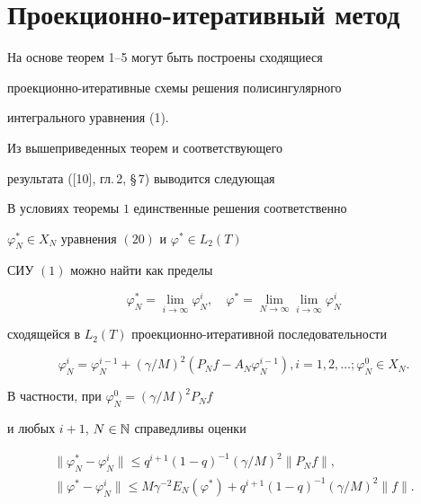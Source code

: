 \section{Проекционно-итеративный метод}





На основе теорем 1--5 могут быть построены сходящиеся


проекционно-итеративные схемы решения полисингулярного 


интегрального уравнения (1).





Из вышеприведенных теорем и соответствующего 


результата ([10], гл.\,2, \S\,7) выводится следующая








\begin{thm}


В условиях теоремы $1$ единственные решения соответственно


$\varphi_N^* \in X_N $ уравнения $(20)$ и $\varphi^\ast\in L_2(T)$


СИУ $(1)$ можно найти как пределы


$$


\varphi_N^*=\lim_{i\rightarrow\infty } \varphi_N^i,\quad


\varphi^\ast =\lim_{N\rightarrow\infty } 


\lim_{i\rightarrow\infty } \varphi_N^i


$$


сходящейся в $L_2(T)$ проекционно-итеративной последовательности


\begin{equation}


\varphi _N^i=\varphi _N^{i-1}+(\gamma /M)^2(P_N f-A_N\varphi _N^{i-1}), 


i=1,2,\ldots ; \varphi_N^0\in X_N.


\end{equation}


В частности, при $ \varphi _N^0=(\gamma /M)^2P_N f $


и любых $i+1$, $N\in \Bbb{N} $ справедливы оценки


\begin{gather}


\|\varphi^*_N-\varphi _N^i\|\leq q^{i+1}(1-q)^{-1}(\gamma /M)^2\|P_N f\|,\\


%


\|\varphi ^\ast -\varphi _N^i\|\leq M\gamma ^{-2} E_N(\varphi ^\ast )+


q^{i+1}(1-q)^{-1}(\gamma /M)^2\|f\|.


\end{gather}


\end{thm}









